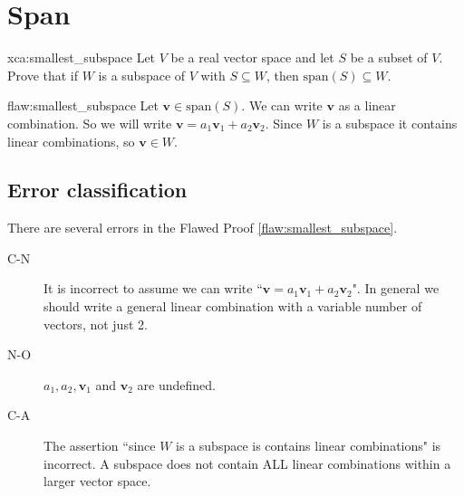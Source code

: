 \section{Span}

\begin{xca}{xca:smallest_subspace}
Let $V$ be a real vector space and let $S$ be a subset of $V$. Prove that if $W$ is a subspace of $V$ with $S \subseteq W$, then $\text{span}(S) \subseteq W$.
\end{xca}

\begin{flaw}{flaw:smallest_subspace} %
Let $\bm{v} \in \text{span}(S)$. We can write $\bm{v}$ as a linear combination. So we will write $\bm{v} = a_1\bm{v}_1 + a_2\bm{v}_2$. Since $W$ is a subspace it contains linear combinations, so $\bm{v} \in W$.

\end{flaw}

\clearpage
\subsection{Error classification}


There are several errors
 in the Flawed Proof \ref{flaw:smallest_subspace}.

 \begin{description}
    \item[C-N] It is incorrect to assume we can write ``$\bm{v} = a_1\bm{v}_1 + a_2\bm{v}_2$". In general we should write a general linear combination with a variable number of vectors, not just 2.
    \item[N-O] $a_1, a_2, \bm{v}_1$ and $\bm{v}_2$ are undefined.
    \item[C-A] The assertion ``since $W$ is a subspace is contains linear combinations" is incorrect. A subspace does not contain ALL linear combinations within a larger vector space.

 	
 \end{description}


